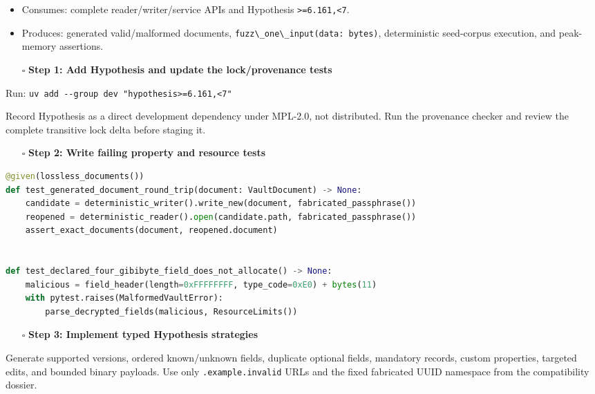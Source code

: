 \documentclass[
  letterpaper,
]{article}
\newcommand{\passthrough}[1]{#1}
\providecommand{\tightlist}{%
  \setlength{\itemsep}{0pt}\setlength{\parskip}{0pt}}
\begin{document}
\begin{itemize}
\tightlist
\item
  Consumes: complete reader/writer/service APIs and Hypothesis \nolinkurl{>=6.161,<7}.
\item
  Produces: generated valid/malformed documents, \passthrough{\lstinline!fuzz\_one\_input(data: bytes)!}, deterministic
  seed-corpus execution, and peak-memory assertions.
\end{itemize}

\begin{itemize}
\tightlist
\item[$\square$]
  \textbf{Step 1: Add Hypothesis and update the lock/provenance tests}
\end{itemize}

Run: \passthrough{\lstinline!uv add --group dev "hypothesis>=6.161,<7"!}

Record Hypothesis as a direct development dependency under MPL-2.0, not distributed. Run the provenance checker and
review the complete transitive lock delta before staging it.

\begin{itemize}
\tightlist
\item[$\square$]
  \textbf{Step 2: Write failing property and resource tests}
\end{itemize}

\begin{lstlisting}[language=Python]
@given(lossless_documents())
def test_generated_document_round_trip(document: VaultDocument) -> None:
    candidate = deterministic_writer().write_new(document, fabricated_passphrase())
    reopened = deterministic_reader().open(candidate.path, fabricated_passphrase())
    assert_exact_documents(document, reopened.document)


def test_declared_four_gibibyte_field_does_not_allocate() -> None:
    malicious = field_header(length=0xFFFFFFFF, type_code=0xE0) + bytes(11)
    with pytest.raises(MalformedVaultError):
        parse_decrypted_fields(malicious, ResourceLimits())
\end{lstlisting}

\begin{itemize}
\tightlist
\item[$\square$]
  \textbf{Step 3: Implement typed Hypothesis strategies}
\end{itemize}

Generate supported versions, ordered known/unknown fields, duplicate optional fields, mandatory records, custom
properties, targeted edits, and bounded binary payloads. Use only \nolinkurl{.example.invalid} URLs and the fixed
fabricated UUID namespace from the compatibility dossier.
\end{document}
